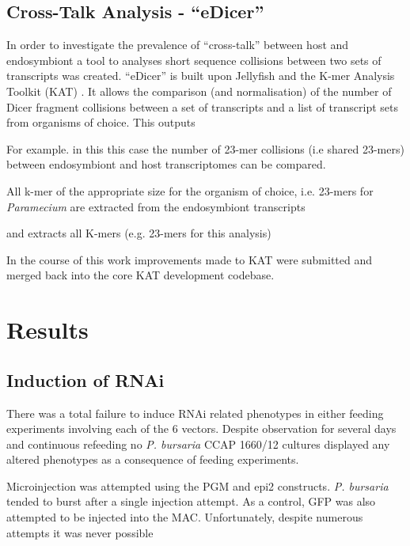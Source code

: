 \subsection{Cross-Talk Analysis - ``eDicer''}

In order to investigate the prevalence of ``cross-talk'' between 
host and endosymbiont a tool to analyses short sequence collisions between two sets
of transcripts was created.  ``eDicer'' is built upon Jellyfish \citep{Marcais2011}
and the K-mer Analysis Toolkit (KAT) \citep{ClavijoKAT}.  It allows
the comparison (and normalisation) of the number of Dicer fragment collisions
between a set of transcripts and a list of transcript sets from organisms
of choice.  This outputs 


For example. in this this case the number of 23-mer collisions (i.e shared
23-mers) between endosymbiont and host transcriptomes can be compared. 


All k-mer of the appropriate size for the organism of choice, i.e. 23-mers
for \textit{Paramecium} are extracted from the endosymbiont transcripts 






and extracts all
K-mers (e.g. 23-mers for this analysis) 



In the course of this work improvements made to KAT were submitted and merged
back into the core KAT development codebase.


\section{Results}

\subsection{Induction of RNAi}

There was a total failure to induce RNAi related phenotypes
in either feeding experiments involving each of the 6 vectors. 
Despite observation for several days and continuous refeeding
no \textit{P. bursaria} CCAP 1660/12 cultures displayed any
altered phenotypes as a consequence of feeding experiments. 

Microinjection was attempted using the PGM and epi2 constructs.
\textit{P. bursaria} tended to burst after a single injection attempt.
As a control, GFP was also attempted to be injected into the MAC.
Unfortunately, despite numerous attempts it was never possible


